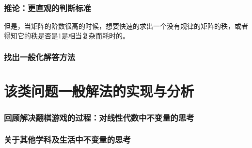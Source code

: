 \documentclass[UTF-8,a4paper]{ctexart}
\begin{document}
\section{推论：更直观的判断标准}
\songti
但是，当矩阵的阶数很高的时候，想要快速的求出一个没有规律的矩阵的秩，或者得知它的秩是否是1是相当复杂而耗时的。


\section{找出一般化解答方法}

\part{该类问题一般解法的实现与分析}
\section{回顾解决翻棋游戏的过程：对线性代数中不变量的思考}
\section{关于其他学科及生活中不变量的思考}
\end{document}
